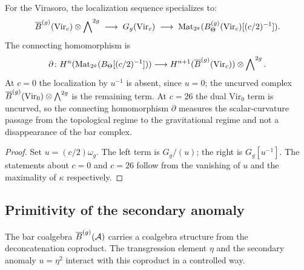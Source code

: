 \begin{corollary}
For the Virasoro, the localization sequence specializes to:
\begin{equation}%
\barB^{(g)}(\mathrm{Vir}_c) \otimes \bigwedge\nolimits^{2g}
\;\longrightarrow\;
G_g(\mathrm{Vir}_c)
\;\longrightarrow\;
\mathrm{Mat}_{2^g}(B_\Theta^{(g)}(\mathrm{Vir}_c)[(c/2)^{-1}]).
\end{equation}
The connecting homomorphism is
\begin{equation}%
\partial\colon
H^n(\mathrm{Mat}_{2^g}(B_\Theta[(c/2)^{-1}]))
\longrightarrow
H^{n+1}(\barB^{(g)}(\mathrm{Vir}_c))
\otimes \bigwedge\nolimits^{2g}.
\end{equation}
At $c = 0$ the localization by \(u^{-1}\) is absent, since
\(u=0\); the uncurved complex
$\overline{B}^{(g)}(\mathrm{Vir}_0) \otimes \bigwedge^{2g}$ is the
remaining term. At $c = 26$ the dual \(\mathrm{Vir}_0\) term is
uncurved, so the connecting homomorphism $\partial$ measures the
scalar-curvature passage from the topological regime to the
gravitational regime and not a disappearance of the bar complex.
\end{corollary}

\begin{proof}
Set $u = (c/2)\omega_g$. The left term is $G_g/(u)$; the right is
$G_g[u^{-1}]$. The statements about $c = 0$ and $c = 26$ follow from
the vanishing of $u$ and the maximality of $\kappa$ respectively.
\end{proof}

%
%

\subsection{Primitivity of the secondary anomaly}

The bar coalgebra $\overline{B}^{(g)}(\mathcal{A})$ carries a coalgebra structure
from the deconcatenation coproduct. The transgression element $\eta$
and the secondary anomaly $u = \eta^2$ interact with this coproduct in
a controlled way.

